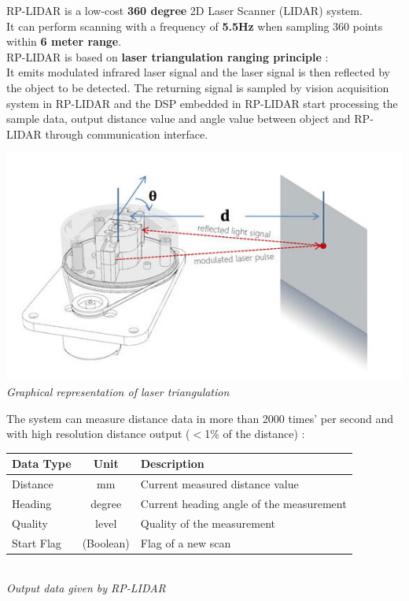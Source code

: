 \documentclass[10pt,a4paper]{article}
\begin{document}
RP-LIDAR is a low-cost \textbf{360 degree} 2D Laser Scanner (LIDAR) system.\\
It can perform scanning with a frequency of\textbf{ 5.5Hz} when sampling 360 points within \textbf{6 meter range}. \\

RP-LIDAR is based on \textbf{laser triangulation ranging principle} :\\
It emits modulated infrared laser signal and the laser signal is then reflected by the object to be detected. The returning signal is sampled by vision acquisition system in RP-LIDAR and the DSP embedded in RP-LIDAR start processing the sample data, output distance value and angle value between object and RP-LIDAR through communication interface.\\

\begin{center}
\includegraphics[scale=0.6]{images/robopeak-sensor.jpg}\\
\textit{Graphical representation of laser triangulation}
\end{center}

The system can measure distance data in more than 2000 times' per second and with high resolution distance output ($<$1\% of the distance) :\\

\begin{center}
\begin{tabular}{|l|c|l|}
\hline
Data Type & Unit & Description\\
\hline
Distance & mm & Current measured distance value\\
Heading & degree & Current heading angle of the measurement \\
Quality & level & Quality of the measurement\\
Start Flag & 	(Boolean) & Flag of a new scan\\
\hline
\end{tabular}\\

\textit{Output data given by RP-LIDAR}
\end{center}
\end{document}
